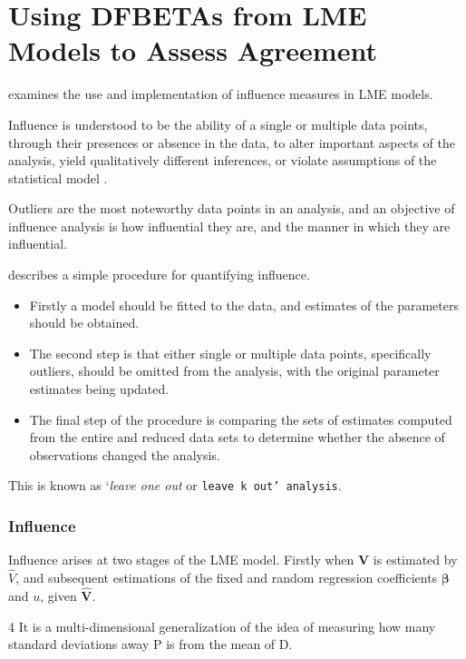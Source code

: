 \newpage


\chapter{Using DFBETAs from LME Models to Assess Agreement}
	
	
	\citet{schab} examines the use and implementation of influence measures in LME models.
	
	Influence is understood to be the ability of a single or multiple data points, through their presences or absence in the data, to alter important aspects of the analysis, yield qualitatively 	different inferences, or violate assumptions of the statistical
	model \citep{schab}.
	
	Outliers are the most noteworthy data points in an analysis, and an objective of influence analysis is how influential they are,
	and the manner in which they are influential.
	
	\citet{schab} describes a simple procedure for quantifying influence.
	\begin{itemize}
		\item Firstly a model should be fitted to the data, and
		estimates of the parameters should be obtained.
		\item The second step is that either single or multiple data points, specifically outliers,
		should be omitted from the analysis, with the original parameter
		estimates being updated.
		\item  The final step of the procedure is comparing the 	sets of estimates computed from the entire and reduced data sets
		to determine whether the absence of observations changed the
		analysis.
	\end{itemize}
	   This is known as `\textit{leave one out} or \texttt{leave k
	out' analysis}.
	


	
	
	\subsection{Influence}
	
	Influence arises at two stages of the LME model. Firstly when $\mathbf{V}$ is estimated by $\hat{V}$, and subsequent
	estimations of the fixed and random regression coefficients $\mathbf{\beta}$ and $u$, given $\mathbf{\hat{V}}$.
	
	4 It is a multi-dimensional generalization of the idea of measuring how many standard deviations away P is from the mean of D. 
	

